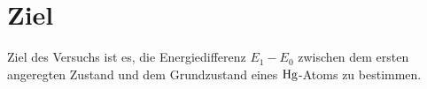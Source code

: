 \section{Ziel}
\label{sec:Ziel}

Ziel des Versuchs ist es, die Energiedifferenz $E_1 - E_0$ zwischen dem ersten angeregten Zustand und dem Grundzustand eines $\ce{Hg}$-Atoms zu bestimmen.
